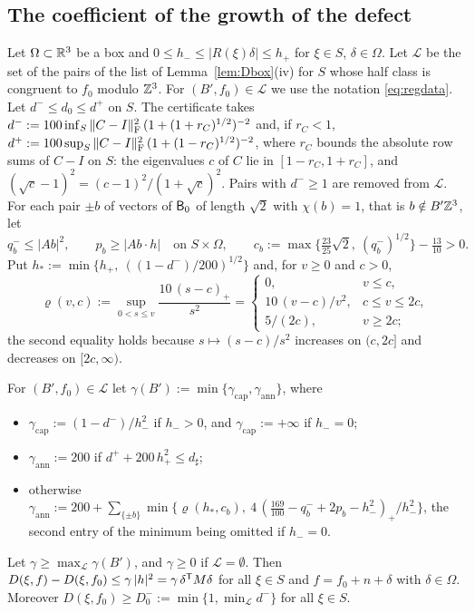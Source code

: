 \subsection{The coefficient of the growth of the defect}\label{ssec:det-gamma}

Let $\Omega\subset\mathbb R^3$ be a box and $0\le h_-\le|R(\xi)\delta|\le h_+$ for $\xi\in S$, $\delta\in\Omega$. Let $\mathcal L$ be the set
of the pairs of the list of Lemma~\ref{lem:Dbox}(iv) for $S$ whose half class is congruent to $f_0$ modulo $\mathbb Z^3$. For
$(B',f_0)\in\mathcal L$ we use the notation \eqref{eq:regdata}. Let $d^-\le d_0\le d^+$ on $S$. The certificate takes
$d^-:=100\inf_S\|C-I\|_\mathrm F^2\,(1+(1+r_C)^{1/2})^{-2}$ and, if $r_C<1$, $d^+:=100\sup_S\|C-I\|_\mathrm F^2\,(1+(1-r_C)^{1/2})^{-2}$, where
$r_C$ bounds the absolute row sums of $C-I$ on $S$: the eigenvalues $c$ of $C$ lie in $[1-r_C,1+r_C]$, and
$(\sqrt c-1)^2=(c-1)^2/(1+\sqrt c)^2$. Pairs with $d^-\ge1$ are removed from $\mathcal L$. For each pair $\pm b$ of vectors of $\mathsf B_0$ of length $\sqrt2$
with $\chi(b)=1$, that is $b\notin B'\mathbb Z^3$, let
\[
  q_b^-\le|Ab|^2,\qquad p_b\ge|Ab\cdot h|\quad\text{on }S\times\Omega,\qquad
  c_b:=\max\bigl\{\tfrac{23}{25}\sqrt2,\ (q_b^-)^{1/2}\bigr\}-\tfrac{13}{10}>0 .
\]
Put $h_*:=\min\bigl\{h_+,\ ((1-d^-)/200)^{1/2}\bigr\}$ and, for $v\ge0$ and $c>0$,
\begin{equation}\label{eq:det-rho}
  \varrho(v,c):=\sup_{0<s\le v}\frac{10\,(s-c)_+}{s^2}=\begin{cases}0,&v\le c,\\ 10\,(v-c)/v^2,&c\le v\le2c,\\ 5/(2c),&v\ge2c;\end{cases}
\end{equation}
the second equality holds because $s\mapsto(s-c)/s^2$ increases on $(c,2c]$ and decreases on $[2c,\infty)$.

\begin{lemma}\label{lem:det-gamma}
For $(B',f_0)\in\mathcal L$ let $\gamma(B'):=\min\{\gamma_{\mathrm{cap}},\gamma_{\mathrm{ann}}\}$, where
\begin{itemize}
\item[\textup{(a)}] $\gamma_{\mathrm{cap}}:=(1-d^-)/h_-^2$ if $h_->0$, and $\gamma_{\mathrm{cap}}:=+\infty$ if $h_-=0$;
\item[\textup{(b)}] $\gamma_{\mathrm{ann}}:=200$ if $d^++200\,h_+^2\le d_\sharp$;
\item[\textup{(c)}] otherwise
$\gamma_{\mathrm{ann}}:=200+\sum_{\{\pm b\}}\min\bigl\{\varrho(h_*,c_b),\ 4\,(\frac{169}{100}-q_b^-+2p_b-h_-^2)_+/h_-^2\bigr\}$,
the second entry of the minimum being omitted if $h_-=0$.
\end{itemize}
Let $\gamma\ge\max_{\mathcal L}\gamma(B')$, and $\gamma\ge0$ if $\mathcal L=\emptyset$. Then
$D(\xi,f)-D(\xi,f_0)\le\gamma\,|h|^2=\gamma\,\delta^\mathsf T M\delta$ for all $\xi\in S$ and $f=f_0+n+\delta$ with $\delta\in\Omega$.
Moreover $D(\xi,f_0)\ge D_0^-:=\min\{1,\min_{\mathcal L}d^-\}$ for all $\xi\in S$.
\end{lemma}

